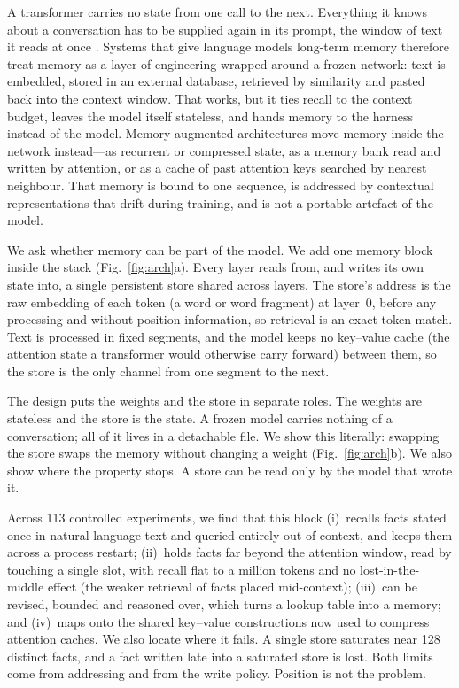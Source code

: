 A transformer carries no state from one call to the next. Everything it knows about a
conversation has to be supplied again in its prompt, the window of text it reads at once
\cite{vaswani2017attention}. Systems that give language models long-term memory therefore
treat memory as a layer of engineering wrapped around a frozen network: text is embedded,
stored in an external database, retrieved by similarity and pasted back into the context
window\cite{lewis2020rag,packer2023memgpt,park2023generative}. That works, but it ties
recall to the context budget, leaves the model itself stateless, and hands memory to the
harness instead of the model. Memory-augmented architectures move memory inside the network
instead---as recurrent or compressed
state\cite{dai2019transformerxl,rae2020compressive,bulatov2022rmt}, as a memory bank read
and written by attention\cite{graves2014ntm,graves2016dnc,weston2015memnet,sukhbaatar2015e2e,wu2022memformer},
or as a cache of past attention keys searched by nearest neighbour\cite{wu2022memorizing}.
That memory is bound to one sequence, is addressed by contextual representations that drift
during training, and is not a portable artefact of the model.

We ask whether memory can be part of the model. We add one memory block inside the stack
(Fig.~\ref{fig:arch}a). Every layer reads from, and writes its own state into, a single
persistent store shared across layers. The store's address is the raw embedding of each
token (a word or word fragment) at layer~0, before any processing and without position
information, so retrieval is an exact token match. Text is processed in fixed segments,
and the model keeps no key--value cache (the attention state a
transformer would otherwise carry forward) between them, so the store is the only channel
from one segment to the next.

The design puts the weights and the store in separate roles. The weights are stateless and
the store is the state. A frozen model carries nothing of a conversation; all of it lives in
a detachable file. We show this literally: swapping the store swaps the memory without
changing a weight (Fig.~\ref{fig:arch}b). We also show where the property stops. A store can
be read only by the model that wrote it.

Across 113 controlled experiments, we find that this block
(i)~recalls facts stated once in natural-language text and queried entirely out of context,
and keeps them across a process restart; (ii)~holds facts far beyond the attention window,
read by touching a single slot, with recall flat to a million tokens and no lost-in-the-middle
effect (the weaker retrieval of facts placed mid-context\cite{liu2024lost}); (iii)~can be
revised, bounded and reasoned over, which turns a lookup table into a memory; and
(iv)~maps onto the shared key--value constructions now used to compress attention
caches\cite{deepseekv41flash2026}. We also locate where it fails. A single store saturates
near 128 distinct facts, and a fact written late into a saturated store is lost. Both limits
come from addressing and from the write policy. Position is not the problem.